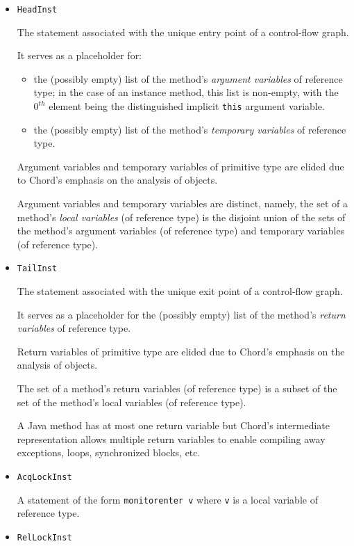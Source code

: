 \documentclass{article}
\providecommand\Chord{{Chord}}
\begin{document}
\begin{itemize}
\item
{\tt HeadInst}

The statement associated with the unique entry point of a control-flow graph.

It serves as a placeholder for:

\begin{itemize}
\item
the (possibly empty) list of the method's {\it argument variables} of reference type;
in the case of an instance method, this list is non-empty,
with the $0^{th}$ element being the distinguished implicit {\tt this}
argument variable.
\item
the (possibly empty) list of the method's {\it temporary variables} of reference type.
\end{itemize}

Argument variables and temporary variables of primitive type are
elided due to \Chord's emphasis on the analysis of objects.

Argument variables and temporary variables are distinct, namely,
the set of a method's {\it local variables} (of reference type)
is the disjoint union of the sets of the method's argument variables (of reference type) and
temporary variables (of reference type).

\item
{\tt TailInst}

The statement associated with the unique exit point of a control-flow graph.

It serves as a placeholder for 
the (possibly empty) list of the method's {\it return variables} of reference type.

Return variables of primitive type are
elided due to \Chord's emphasis on the analysis of objects.

The set of a method's return variables (of reference type) is a subset of the set
of the method's local variables (of reference type).

A Java method has at most one return variable but
\Chord's intermediate representation allows multiple return variables
to enable compiling away exceptions, loops, synchronized blocks, etc.

\item
{\tt AcqLockInst}

A statement of the form {\tt monitorenter v} where
{\tt v} is a local variable of reference type.

\item
{\tt RelLockInst}


\end{itemize}
\end{document}
